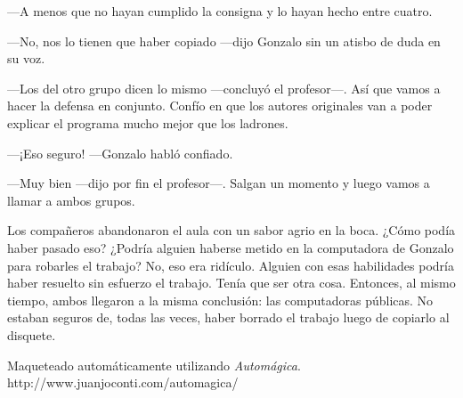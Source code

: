 \documentclass[12pt,twoside,openright]{book}
\begin{document}
---A menos que no hayan cumplido la consigna y lo hayan hecho entre cuatro.

---No, nos lo tienen que haber copiado ---dijo Gonzalo sin un atisbo de duda en su voz.

---Los del otro grupo dicen lo mismo ---concluyó el profesor---. Así que vamos a hacer la defensa en conjunto. Confío en que los autores originales van a poder explicar el programa mucho mejor que los ladrones.

---¡Eso seguro! ---Gonzalo habló confiado.

---Muy bien ---dijo por fin el profesor---. Salgan un momento y luego vamos a llamar a ambos grupos.

Los compañeros abandonaron el aula con un sabor agrio en la boca. ¿Cómo podía haber pasado eso? ¿Podría alguien haberse metido en la computadora de Gonzalo para robarles el trabajo? No, eso era ridículo. Alguien con esas habilidades podría haber resuelto sin esfuerzo el trabajo. Tenía que ser otra cosa. Entonces, al mismo tiempo, ambos llegaron a la misma conclusión: las computadoras públicas. No estaban seguros de, todas las veces, haber borrado el trabajo luego de copiarlo al disquete.


\cleardoublepage

%

\hspace{0pt}
\vfill
\begin{center}
Maqueteado automáticamente utilizando \emph{Automágica}.
\bigbreak
http://www.juanjoconti.com/automagica/
\end{center}
\vfill
\hspace{0pt}
\end{document}
